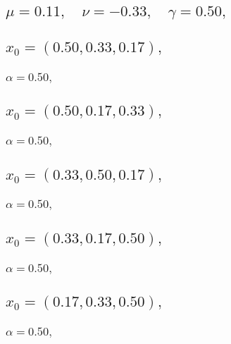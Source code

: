 \documentclass[a4paper]{article}
\begin{document}
\begin{multicols*}{2}
   \section{\(\mu = 0.11,\quad \nu = -0.33,\quad \gamma = 0.50,\quad \)}
   

   \subsection{\(x_0 = (0.50,0.33,0.17),\quad \)}
   

   \subsubsection{\(\alpha = 0.50,\quad \)}
   

   \subsection{\(x_0 = (0.50,0.17,0.33),\quad \)}
   

   \subsubsection{\(\alpha = 0.50,\quad \)}
   

   \subsection{\(x_0 = (0.33,0.50,0.17),\quad \)}
   

   \subsubsection{\(\alpha = 0.50,\quad \)}
   

   \subsection{\(x_0 = (0.33,0.17,0.50),\quad \)}
   

   \subsubsection{\(\alpha = 0.50,\quad \)}
   

   \subsection{\(x_0 = (0.17,0.33,0.50),\quad \)}
   

   \subsubsection{\(\alpha = 0.50,\quad \)}
   


\end{multicols*}
\end{document}
